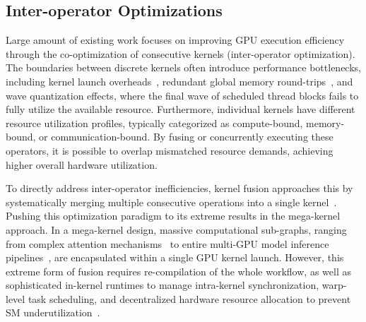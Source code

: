 
\subsection{Inter-operator Optimizations}

Large amount of existing work focuses on improving GPU execution efficiency through the co-optimization of consecutive kernels (inter-operator optimization). The boundaries between discrete kernels often introduce performance bottlenecks, including kernel launch overheads~\cite{shen2020nimble}, redundant global memory round-trips~\cite{le2023welder}, and wave quantization effects, where the final wave of scheduled thread blocks fails to fully utilize the available resource. Furthermore, individual kernels have different resource utilization profiles, typically categorized as compute-bound, memory-bound, or communication-bound. By fusing or concurrently executing these operators, it is possible to overlap mismatched resource demands, achieving higher overall hardware utilization.

To directly address inter-operator inefficiencies, kernel fusion approaches this by systematically merging multiple consecutive operations into a single kernel~\cite{chen2018tvm, li2022automatic}. Pushing this optimization paradigm to its extreme results in the mega-kernel approach. In a mega-kernel design, massive computational sub-graphs, ranging from complex attention mechanisms~\cite{dao2022flashattention} to entire multi-GPU model inference pipelines~\cite{wu2024mirage,cheng2025mpk}, are encapsulated within a single GPU kernel launch. However, this extreme form of fusion requires re-compilation of the whole workflow, as well as sophisticated in-kernel runtimes to manage intra-kernel synchronization, warp-level task scheduling, and decentralized hardware resource allocation to prevent SM underutilization~\cite{ma2020rammer}. 

